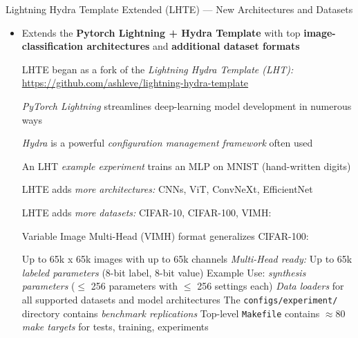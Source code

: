 \begin{slide}[\slideopts,toc={Lightning Hydra Template Ext}]{Lightning Hydra Template Extended (LHTE) --- New Architectures and Datasets}


\vspace{-1em}
  

  \begin{itemize}

    \item Extends the \textbf{Pytorch Lightning + Hydra Template} with top \textbf{image-classification architectures} and \textbf{additional dataset formats}

    \mpitem LHTE began as a fork of the \emph{Lightning Hydra Template (LHT):} \url{https://github.com/ashleve/lightning-hydra-template}
    \begin{itemize}

      \mpitem \emph{PyTorch Lightning} streamlines deep-learning model development in
      numerous ways

      \mpitem \emph{Hydra} is a powerful \emph{configuration management framework} often used

      \mpitem An LHT \emph{example experiment} trains an MLP on MNIST (hand-written digits)

    \end{itemize}

    \mpitem LHTE adds \emph{more architectures:} CNNs,  ViT, ConvNeXt, EfficientNet

    \mpitem LHTE adds \emph{more datasets:} CIFAR-10, CIFAR-100, VIMH:

    \mpitem Variable Image Multi-Head (VIMH) format generalizes CIFAR-100:
    \begin{itemize}
      \mpitem Up to 65k x 65k images with up to 65k channels %
      \mpitem \emph{Multi-Head ready:} Up to 65k \emph{labeled parameters} (8-bit label, 8-bit value)
      \mpitem Example Use: \emph{synthesis parameters} ($\le$ 256 parameters with $\le$ 256 settings each)
      \mpitem \emph{Data loaders} for all supported datasets and model architectures
      \mpitem The \texttt{configs/experiment/} directory contains \emph{benchmark replications} %
      \mpitem Top-level \texttt{Makefile} contains $\approx 80$ \emph{make targets} for tests, training, experiments
    \end{itemize}
  \end{itemize}

\end{slide}

